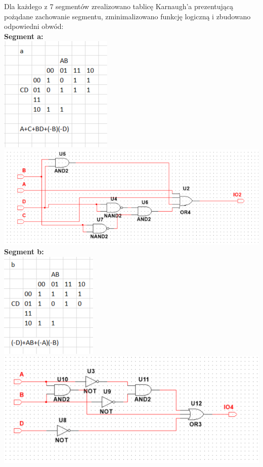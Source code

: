 \documentclass[12pt,a4paper]{article}
\begin{document}
\raggedright
Dla każdego z 7 segmentów zrealizowano tablicę Karnaugh'a prezentującą pożądane zachowanie segmentu, zminimalizowano funkcję logiczną i zbudowano odpowiedni obwód:\\
\centering
\textbf{Segment a:}\\
\includegraphics[scale=0.8]{7seg/seg0}\\
\includegraphics[scale=1]{7seg/seg0circ}\\
\textbf{Segment b:}\\
\includegraphics[scale=0.8]{7seg/seg1}\\
\includegraphics[scale=1]{7seg/seg1circ}\\
\end{document}
